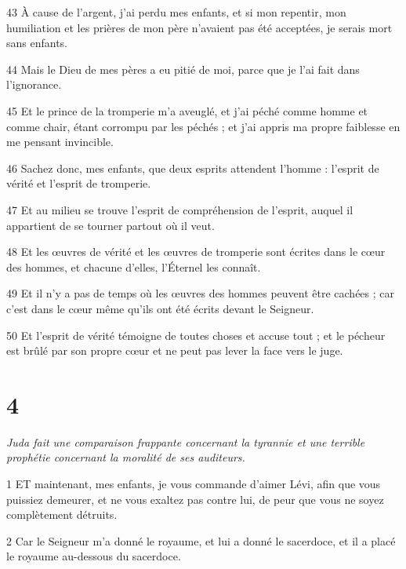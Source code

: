 \par 43 À cause de l'argent, j'ai perdu mes enfants, et si mon repentir, mon humiliation et les prières de mon père n'avaient pas été acceptées, je serais mort sans enfants.

\par 44 Mais le Dieu de mes pères a eu pitié de moi, parce que je l'ai fait dans l'ignorance.

\par 45 Et le prince de la tromperie m'a aveuglé, et j'ai péché comme homme et comme chair, étant corrompu par les péchés ; et j'ai appris ma propre faiblesse en me pensant invincible.

\par 46 Sachez donc, mes enfants, que deux esprits attendent l'homme : l'esprit de vérité et l'esprit de tromperie.

\par 47 Et au milieu se trouve l'esprit de compréhension de l'esprit, auquel il appartient de se tourner partout où il veut.

\par 48 Et les œuvres de vérité et les œuvres de tromperie sont écrites dans le cœur des hommes, et chacune d'elles, l'Éternel les connaît.

\par 49 Et il n'y a pas de temps où les œuvres des hommes peuvent être cachées ; car c'est dans le cœur même qu'ils ont été écrits devant le Seigneur.

\par 50 Et l'esprit de vérité témoigne de toutes choses et accuse tout ; et le pécheur est brûlé par son propre cœur et ne peut pas lever la face vers le juge.

\chapter{4}

\par \textit{Juda fait une comparaison frappante concernant la tyrannie et une terrible prophétie concernant la moralité de ses auditeurs.}

\par 1 ET maintenant, mes enfants, je vous commande d'aimer Lévi, afin que vous puissiez demeurer, et ne vous exaltez pas contre lui, de peur que vous ne soyez complètement détruits.

\par 2 Car le Seigneur m'a donné le royaume, et lui a donné le sacerdoce, et il a placé le royaume au-dessous du sacerdoce.

